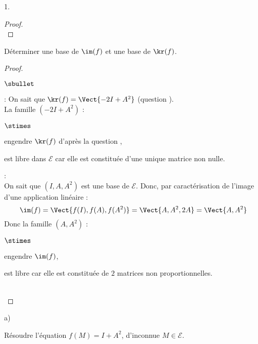 \documentclass[11pt]{article}%
\begin{document}
\begin{noliste}{1.}
\begin{proof}
 
 
 
        
        
 ~\\[-1.4cm]
\end{proof}

\item Déterminer une base de $\im(f)$ et une base de 
$\kr(f)$.

\begin{proof}~
  \begin{noliste}{$\sbullet$}
   \item {} :
   On sait que $\kr(f)=\Vect{-2I+A^2}$ (question ).\\[.2cm]
   La famille $(-2I+A^2)$ :
   \begin{noliste}{$\stimes$}
    \item engendre $\kr(f)$ d'après la question ,
    \item est libre dans $\mathcal{E}$ car elle est constituée d'une 
    unique matrice non nulle.
   \end{noliste}
   
   \item {} :\\[.1cm]
   On sait que $(I,A,A^2)$ est une base de $\mathcal{E}$. Donc, par 
   caractérisation de l'image d'une application linéaire :
 \[
  \im(f)=\Vect{f(I),f(A),f(A^2)} = \Vect{A,A^2,2A}=\Vect{A,A^2}
 \]
 Donc la famille $(A,A^2)$ :
 \begin{noliste}{$\stimes$}
  \item engendre $\im(f)$,
  \item est libre car elle est constituée de $2$ matrices non 
  proportionnelles.
 \end{noliste}
  \end{noliste}
  
  ~\\[-1.4cm]
\end{proof}

\item 
\begin{noliste}{a)}
\item Résoudre l'équation $f(M)=I+A^2$, d'inconnue $M\in \mathcal{E}$.


\end{noliste}
\end{noliste}
\end{document}
